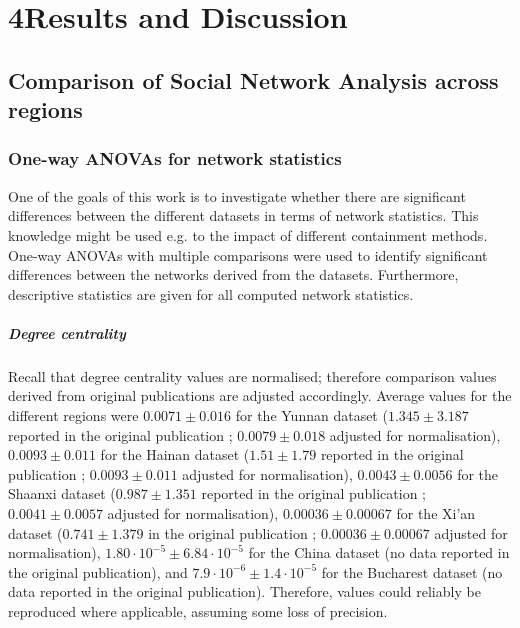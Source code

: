 \chapter{4\quad Results and Discussion}
\label{ch:results_discussion}

\section{Comparison of Social Network Analysis across regions}
\label{sec:res_sna}

\subsection{One-way ANOVAs for network statistics}
\label{sec:sna_anovas}

One of the goals of this work is to investigate whether there are significant differences between the different datasets in terms of network statistics. This knowledge might be used e.g. to the impact of different containment methods. One-way ANOVAs with multiple comparisons were used to identify significant differences between the networks derived from the datasets. Furthermore, descriptive statistics are given for all computed network statistics.

\paragraph{Degree centrality} Recall that degree centrality values are normalised; therefore comparison values derived from original publications are adjusted accordingly. Average values for the different regions were $0.0071\pm0.016$ for the Yunnan dataset ($1.345\pm3.187$ reported in the original publication \cite{hainan_publication}; $0.0079\pm0.018$ adjusted for normalisation), $0.0093\pm0.011$ for the Hainan dataset ($1.51\pm1.79$ reported in the original publication \cite{hainan_publication}; $0.0093\pm0.011$ adjusted for normalisation), $0.0043\pm0.0056$ for the Shaanxi dataset ($0.987\pm1.351$ reported in the original publication \cite{shaanxi_publication}; $0.0041\pm0.0057$ adjusted for normalisation), $0.00036\pm0.00067$ for the Xi'an dataset ($0.741\pm1.379$ in the original publication \cite{xian_publication}; $0.00036\pm0.00067$ adjusted for normalisation), $1.80\cdot 10^{-5}\pm6.84\cdot 10^{-5}$ for the China dataset (no data reported in the original publication), and $7.9\cdot 10^{-6}\pm1.4\cdot 10^{-5}$ for the Bucharest dataset (no data reported in the original publication). Therefore, values could reliably be reproduced where applicable, assuming some loss of precision.

